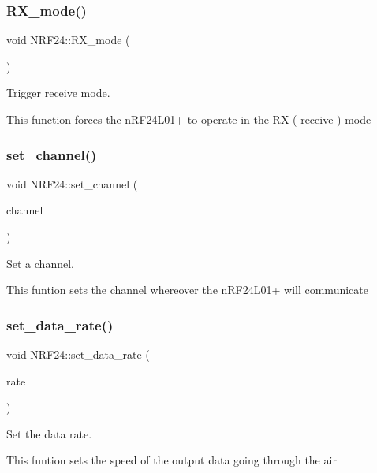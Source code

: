 \subsubsection{\texorpdfstring{R\+X\+\_\+mode()}{RX\_mode()}}
{\footnotesize\ttfamily void N\+R\+F24\+::\+R\+X\+\_\+mode (\begin{DoxyParamCaption}{ }\end{DoxyParamCaption})}



Trigger receive mode. 

This function forces the n\+R\+F24\+L01+ to operate in the RX ( receive ) mode \mbox{\label{classNRF24_a300f0a27471f25d498809799161d811f}} 
\subsubsection{\texorpdfstring{set\+\_\+channel()}{set\_channel()}}
{\footnotesize\ttfamily void N\+R\+F24\+::set\+\_\+channel (\begin{DoxyParamCaption}\item[{int}]{channel }\end{DoxyParamCaption})}



Set a channel. 

This funtion sets the channel whereover the n\+R\+F24\+L01+ will communicate \mbox{\label{classNRF24_a57ed330144bf0fd0f72ace57cc0a63bc}} 
\subsubsection{\texorpdfstring{set\+\_\+data\+\_\+rate()}{set\_data\_rate()}}
{\footnotesize\ttfamily void N\+R\+F24\+::set\+\_\+data\+\_\+rate (\begin{DoxyParamCaption}\item[{data\+Rate}]{rate }\end{DoxyParamCaption})}



Set the data rate. 

This funtion sets the speed of the output data going through the air \mbox{\label{classNRF24_a74955df5f940b99709ddea27cfd5422e}} 
